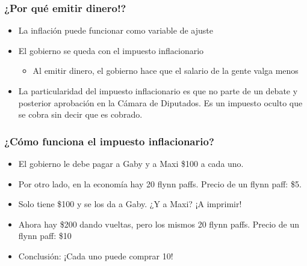 \documentclass{beamer}
\begin{document}


\begin{frame}
\frametitle{¿Por qué emitir dinero!?}
\begin{itemize}
    \item La inflación puede funcionar como variable de ajuste \vspace{2mm}
    \item El gobierno se queda con el impuesto inflacionario
    \begin{itemize}
        \item Al emitir dinero, el gobierno hace que el salario de la gente valga menos
    \end{itemize}
    \item La particularidad del impuesto inflacionario es que no parte de un debate y posterior aprobación en la Cámara de Diputados. Es un impuesto oculto que se cobra sin decir que es cobrado.
\end{itemize}
\end{frame}

\begin{frame}
\frametitle{¿Cómo funciona el impuesto inflacionario?}
\begin{itemize}
    \item El gobierno le debe pagar a Gaby y a Maxi \$100 a cada uno. 
    \item Por otro lado, en la economía hay 20 flynn paffs. Precio de un flynn paff: \$5.
    \item Solo tiene \$100 y se los da a Gaby. ¿Y a Maxi? ¡A imprimir!
    \item Ahora hay \$200 dando vueltas, pero los mismos 20 flynn paffs. Precio de un flynn paff: \$10
    \item Conclusión: ¡Cada uno puede comprar 10!
\end{itemize}
\end{frame}
\end{document}
